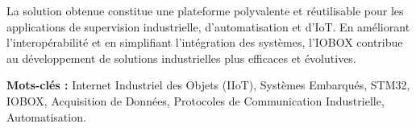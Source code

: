 La solution obtenue constitue une plateforme polyvalente et réutilisable pour les applications de supervision industrielle, d’automatisation et d’IoT. En améliorant l’interopérabilité et en simplifiant l’intégration des systèmes, l’IOBOX contribue au développement de solutions industrielles plus efficaces et évolutives.

\fussy
\textbf{Mots-clés :} Internet Industriel des Objets (IIoT), Systèmes Embarqués, STM32, IOBOX, Acquisition de Données, Protocoles de Communication Industrielle, Automatisation.
